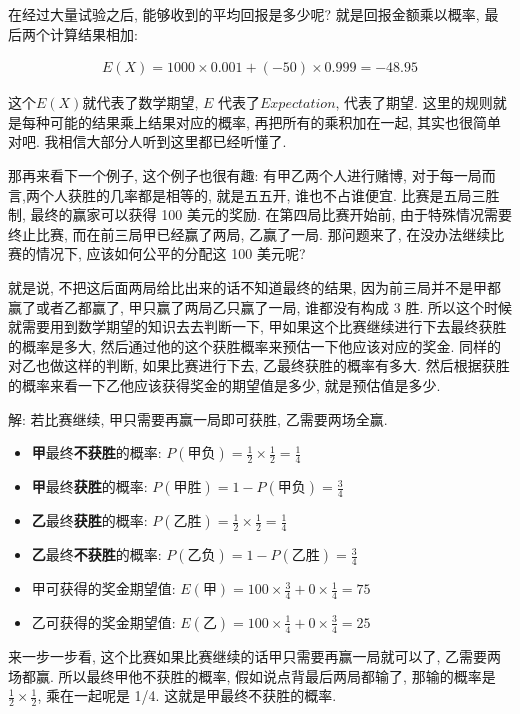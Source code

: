 在经过大量试验之后, 能够收到的平均回报是多少呢? 就是回报金额乘以概率, 最后两个计算结果相加:

\begin{align*}
  E(X) = 1000 \times 0.001 + (-50) \times 0.999 = -48.95
\end{align*}

这个$E(X)$就代表了数学期望, $E$ 代表了$\mathord{Expectation}$, 代表了期望. 这里的规则就是每种可能的结果乘上结果对应的概率, 再把所有的乘积加在一起, 其实也很简单对吧. 我相信大部分人听到这里都已经听懂了. 

那再来看下一个例子, 这个例子也很有趣: 有甲乙两个人进行赌博, 对于每一局而言,两个人获胜的几率都是相等的, 就是五五开, 谁也不占谁便宜. 比赛是五局三胜制, 最终的赢家可以获得 100 美元的奖励. 在第四局比赛开始前, 由于特殊情况需要终止比赛, 而在前三局甲已经赢了两局, 乙赢了一局. 那问题来了, 在没办法继续比赛的情况下, 应该如何公平的分配这 100 美元呢? 

就是说, 不把这后面两局给比出来的话不知道最终的结果, 因为前三局并不是甲都赢了或者乙都赢了, 甲只赢了两局乙只赢了一局, 谁都没有构成 3 胜. 所以这个时候就需要用到数学期望的知识去去判断一下, 甲如果这个比赛继续进行下去最终获胜的概率是多大, 然后通过他的这个获胜概率来预估一下他应该对应的奖金. 同样的对乙也做这样的判断, 如果比赛进行下去, 乙最终获胜的概率有多大. 然后根据获胜的概率来看一下乙他应该获得奖金的期望值是多少, 就是预估值是多少.

解: 若比赛继续, 甲只需要再赢一局即可获胜, 乙需要两场全赢. 

\begin{itemize}
  \item \textbf{甲}最终\textbf{不获胜}的概率: $P(\mbox{甲负}) = \frac{1}{2} \times \frac{1}{2} = \frac{1}{4} $
  \item \textbf{甲}最终\textbf{获胜}的概率: $P(\mbox{甲胜}) = 1 - P(\mbox{甲负}) = \frac{3}{4}$ 
  \item \textbf{乙}最终\textbf{获胜}的概率: $P(\mbox{乙胜})  = \frac{1}{2} \times \frac{1}{2} = \frac{1}{4}$ 
  \item \textbf{乙}最终\textbf{不获胜}的概率: $P(\mbox{乙负}) = 1 - P(\mbox{乙胜})  = \frac{3}{4}$ 
  \item 甲可获得的奖金期望值: $E(\mbox{甲}) = 100 \times \frac{3}{4} + 0 \times \frac{1}{4} = 75$ 
  \item 乙可获得的奖金期望值: $E(\mbox{乙}) = 100 \times \frac{1}{4} + 0 \times \frac{3}{4} = 25$
\end{itemize}

来一步一步看, 这个比赛如果比赛继续的话甲只需要再赢一局就可以了, 乙需要两场都赢. 所以最终甲他不获胜的概率, 假如说点背最后两局都输了, 那输的概率是$\frac{1}{2} \times \frac{1}{2}$, 乘在一起呢是 1/4. 这就是甲最终不获胜的概率. 

